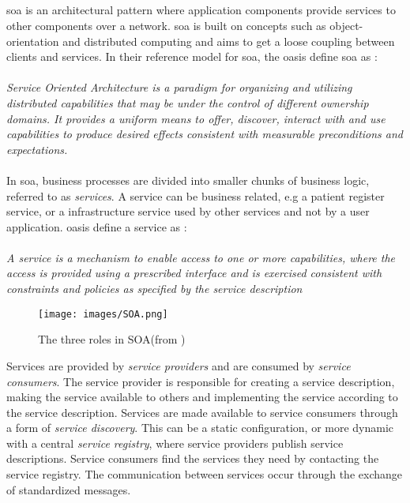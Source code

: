 \subsection{}
\gls{soa} is an architectural pattern where application components
provide services to other components over a network. \gls{soa} is built on
concepts such as object-orientation and distributed computing and aims to get
a loose coupling between clients and services. In their reference model for
\gls{soa}, the \gls{oasis} define \gls{soa} as \cite{oasis-soa-reference-model}:

\paragraph{}

\textit{Service Oriented Architecture is a paradigm for organizing and utilizing
distributed capabilities that may be under the control of different ownership
domains. It provides a uniform means to offer, discover, interact with and use
capabilities to produce desired effects consistent with measurable preconditions
and expectations.} %

\paragraph{}

In \gls{soa}, business processes are divided into smaller chunks of business
logic, referred to as \textit{services}. A service can be business related, e.g
a patient register service, or a infrastructure service used by other services
and not by a user application. \gls{oasis} define a service as
\cite{oasis-soa-reference-model}:

\paragraph{}
\textit{
A service is a mechanism to enable access to one or more capabilities, where the
access is  provided using a prescribed interface and is exercised consistent
with constraints and policies as  specified by the service description
}

\begin{figure}[h]
\texttt{[image: images/SOA.png]}
\caption{The three roles in SOA(from \cite{ist-090})}
\end{figure}

Services are provided by \textit{service providers} and are consumed by
\textit{service consumers}. The service provider is responsible for creating a
service description, making the service available to others and implementing the
service according to the service description. Services are made available to
service consumers through a form of \textit{service discovery}. This can be a
static configuration, or more dynamic with a central \textit{service registry},
where service providers publish service descriptions. Service consumers find the
services they need by contacting the service registry. The communication between
services occur through the exchange of standardized messages.

